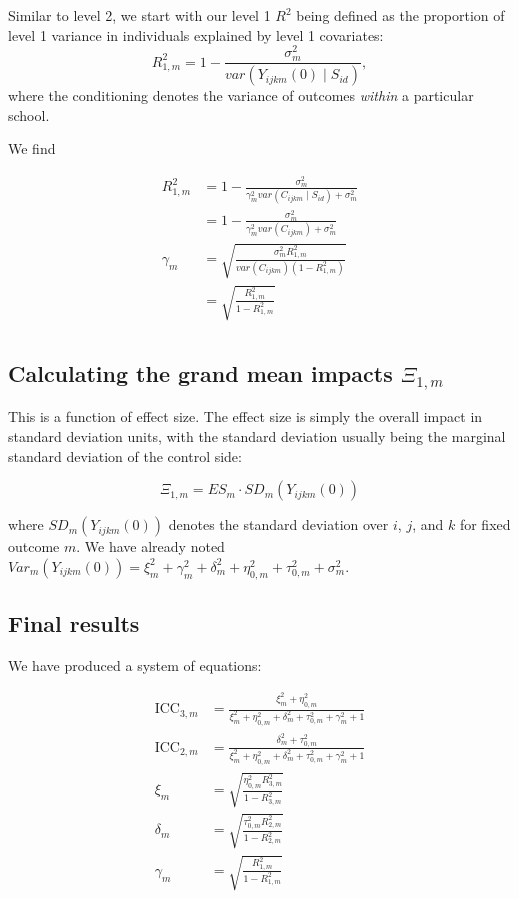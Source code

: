 \documentclass[12pt]{article}
\begin{document}
Similar to level 2, we start with our level 1 $R^2$ being defined as the proportion of level 1 variance in individuals explained by level 1 covariates:
\[ R^2_{1,m} = 1 - \frac{ \sigma^2_m }{ var( Y_{ijkm}(0) \mid S_{id})},  \]
where the conditioning denotes the variance of outcomes \emph{within} a particular school.


We find

\begin{align*}
R^2_{1,m} &= 1 - \frac{ \sigma^2_m }{ \gamma_m^2 var( C_{ijkm} \mid S_{id} ) + \sigma^2_m }\\
&= 1 - \frac{ \sigma^2_m }{ \gamma_m^2 var( C_{ijkm}) + \sigma^2_m }\\
\gamma_m &= \sqrt{\frac{\sigma^2_m R_{1,m}^2}{var( C_{ijkm})(1 - R_{1,m}^2)}}\\
&= \sqrt{\frac{R_{1,m}^2}{1 - R_{1,m}^2}}\\
\end{align*}


\subsection{Calculating the grand mean impacts $\Xi_{1,m}$}

This is a function of effect size.  The effect size is simply the overall impact in standard deviation units, with the standard deviation usually being the marginal standard deviation of the control side:

\[ \Xi_{1,m} = ES_m \cdot SD_m( Y_{ijkm}(0) ) \]

where $SD_m(Y_{ijkm}(0))$ denotes the standard deviation over $i$, $j$, and $k$ for fixed outcome $m$.
We have already noted $Var_m( Y_{ijkm}(0) ) = \xi_m^2 + \gamma_m^2  + \delta_m^2  +  \eta^2_{0,m} + \tau^2_{0,m} + \sigma^2_m$.


\subsection{Final results}

We have produced a system of equations:

\begin{align*}
\text{ICC}_{3,m} &= \frac{\xi^2_m + \eta_{0,m}^2}{\xi_m^2 +  \eta^2_{0,m} + \delta_m^2  + \tau^2_{0,m} + \gamma_m^2 + 1}\\
\text{ICC}_{2,m} &= \frac{\delta_m^2  + \tau_{0,m}^2}{\xi_m^2 +  \eta^2_{0,m} + \delta_m^2  + \tau^2_{0,m} + \gamma_m^2 + 1}\\
\xi_m  &= \sqrt{\frac{\eta^2_{0,m}R_{3,m}^2}{1 - R_{3,m}^2}}\\
\delta_m &= \sqrt{\frac{\tau^2_{0,m}R_{2,m}^2}{1 - R_{2,m}^2}}\\
\gamma_m &= \sqrt{\frac{R_{1,m}^2}{1 - R_{1,m}^2}}
\end{align*}
\end{document}
